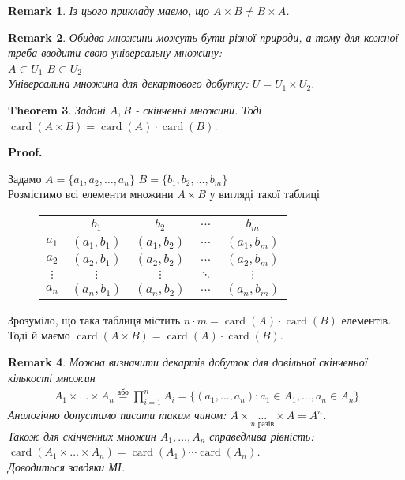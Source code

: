 \documentclass[a4paper, 14pt]{extarticle}
\makeatletter
\theoremstyle{theoremdd}
\newtheorem{theorem}{Theorem}[subsection]
\theoremstyle{theoremdd}
\theoremstyle{theoremdd}
\theoremstyle{theoremdd}
\theoremstyle{theoremdd}
\theoremstyle{theoremdd}
\theoremstyle{theoremdd}
\theoremstyle{theoremdd}
\theoremstyle{theoremdd}
\theoremstyle{theoremdd}
\theoremstyle{theoremdd}
\newtheorem{remark}[theorem]{Remark}
\theoremstyle{theoremdd}
\theoremstyle{theoremdd}
\theoremstyle{theoremdd}
\theoremstyle{theoremdd}
\renewenvironment{proof}[1][Proof.\\]{\par
\pushQED{\hfill \qed}%
\normalfont \topsep6\p@\@plus6\p@\relax
\trivlist
\item\relax
{\bfseries
#1\@addpunct{.}}\hspace\labelsep\ignorespaces
}{%
\popQED\endtrivlist\@endpefalse
}
\DeclareMathOperator{\card}{card}
\makeatother
\begin{document}
\begin{remark}
Із цього прикладу маємо, що $A \times B \neq B \times A$.
\end{remark}

\begin{remark}
Обидва множини можуть бути різної природи, а тому для кожної треба вводити свою універсальну множину:\\
$A \subset U_1$ \hspace{1cm} $B \subset U_2$\\
Універсальна множина для декартового добутку: $U = U_1 \times U_2$.
\end{remark}

\begin{theorem}
Задані $A,B$ - скінченні множини. Тоді\\
$\card(A \times B) = \card(A) \cdot \card(B)$.
\end{theorem}

\begin{proof}
Задамо $A = \{a_1,a_2,\dots,a_n\}$ \hspace{0.5cm} $B = \{b_1,b_2,\dots,b_m\}$\\
Розмістимо всі елементи множини $A \times B$ у вигляді такої таблиці
\begin{figure}[H]
\centering
\begin{tabular}{c|cccc}
$ $ & $b_1$ & $b_2$ & $\dots$ & $b_m$ \\
\hline
$a_1$ & $(a_1,b_1)$ & $(a_1,b_2)$ & $\dots$ & $(a_1,b_m)$ \\
$a_2$ & $(a_2,b_1)$ & $(a_2,b_2)$ & $\dots$ & $(a_2,b_m)$ \\
$\vdots$ & $\vdots$ & $\vdots$ & $\ddots$ & $\vdots$ \\
$a_n$ & $(a_n,b_1)$ & $(a_n,b_2)$ & $\dots$ & $(a_n,b_m)$
\end{tabular}
\end{figure}
Зрозуміло, що така таблиця містить $n \cdot m = \card(A) \cdot \card(B)$ елементів.\\
Тоді й маємо $\card(A \times B) = \card(A) \cdot \card(B)$.
\end{proof}

\begin{remark}
Можна визначити декартів добуток для довільної скінченної кількості множин
\begin{align*}
A_1 \times \dots \times A_n \overset{\text{або}}{=} \prod_{i=1}^n A_i = \{(a_1,\dots,a_n): a_1 \in A_1, \dots, a_n \in A_n\}
\end{align*}
Аналогічно допустимо писати таким чином: $A \times \underset{n \text{ разів}}{\dots} \times A = A^n$.\\
Також для скінченних множин $A_1,\dots,A_n$ справедлива рівність:\\
$\card(A_1 \times \dots \times A_n) = \card(A_1) \cdots \card(A_n)$.\\
\textit{Доводиться завдяки МІ.}
\end{remark}
\end{document}
